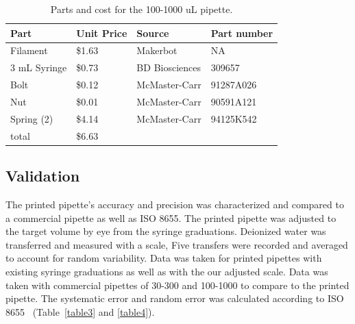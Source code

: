 \documentclass[10pt,letterpaper]{article}
\begin{document}
\begin{table}[!ht]
\centering
\caption{Parts and cost for the 100-1000 uL pipette.}
\label{table2}
\begin{tabular}{|l|l|l|l|}
	\hline
	Part         & Unit Price & Source         & Part number \\ \hline
	Filament     & \$1.63     & Makerbot       & NA          \\ \hline
	3 mL Syringe & \$0.73     & BD Biosciences & 309657      \\ \hline
	Bolt         & \$0.12     & McMaster-Carr  & 91287A026   \\ \hline
	Nut          & \$0.01     & McMaster-Carr  & 90591A121   \\ \hline
	Spring (2)   & \$4.14     & McMaster-Carr  & 94125K542   \\ \hline
	total        & \$6.63     &                &             \\ \hline
\end{tabular}
\end{table}

\subsection*{Validation}
The printed pipette’s accuracy and precision was characterized and compared to a commercial pipette as well as ISO 8655.
The printed pipette was adjusted to the target volume by eye from the syringe graduations.
Deionized water was transferred and measured with a scale,
Five transfers were recorded and averaged to account for random variability.
Data was taken for printed pipettes with existing syringe graduations as well as with the our adjusted scale.
Data was taken with commercial pipettes of 30-300 and 100-1000 to compare to the printed pipette. 
The systematic error and random error was calculated according to ISO 8655~\cite{ISO8655} (Table~\ref{table3} and \ref{table4}).
\end{document}
